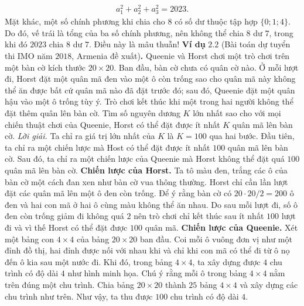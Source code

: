\begin{multicols}{2}
	\begin{align*}
		a_1^2 + a_2^2 + a_3^2 =2023.
	\end{align*}
	Mặt khác, một số chính phương khi chia cho $8$ có số dư thuộc tập hợp $\{0;1;4\}$. Do đó, vế trái là tổng của ba số chính phương, nên không thể chia $8$ dư $7$, trong khi đó $2023$ chia $8$ dư $7$. Điều này là mâu thuẫn!   
	\vskip 0.1cm
	\textbf{\color{hoccungpi}Ví dụ} $\pmb{2.2}$ (Bài toán dự tuyển thi IMO năm $2018$, Armenia đề xuất)\textbf{\color{hoccungpi}.}
	Queenie và Horst chơi một trò chơi trên một bàn cờ kích thước $20 \times 20$. Ban đầu, bàn cờ chưa có quân cờ nào. Ở mỗi lượt đi, Horst đặt một quân mã đen vào một ô còn trống sao cho quân mã này không thể ăn được bất cứ quân mã nào đã đặt trước đó; sau đó, Queenie đặt một quân hậu vào một ô trống tùy ý. Trò chơi kết thúc khi một trong hai người không thể đặt thêm quân lên bàn cờ. Tìm số nguyên dương $K$ lớn nhất sao cho với mọi chiến thuật chơi của Queenie, Horst có thể đặt được ít nhất $K$ quân mã lên bàn cờ.  
	\vskip 0.1cm
	\textit{Lời giải.}
	Ta chỉ ra giá trị lớn nhất của $K$ là $K=100$ qua hai bước. Đầu tiên, ta chỉ ra một chiến lược mà Host có thể đặt được ít nhất $100$ quân mã lên bàn cờ. Sau đó, ta chỉ ra một chiến lược của Queenie mà Horst không thể đặt quá $100$ quân mã lên bàn cờ.
	\vskip 0.1cm
	\textbf{\color{hoccungpi}Chiến lược của Horst.} Ta tô màu đen, trắng các ô của bàn cờ một cách đan xen như bàn cờ vua thông thường. Horst chỉ cần lần lượt đặt các quân mã lên một ô đen còn trống. Để ý rằng bàn cờ có $20\cdot 20/2 = 200$ ô đen và hai con mã ở hai ô cùng màu không thể ăn nhau. Do sau mỗi lượt đi, số ô đen còn trống giảm đi không quá $2$ nên trò chơi chỉ kết thúc sau ít nhất $100$ lượt đi và vì thế Horst có thể đặt được $100$ quân mã.
	\vskip 0.1cm
	\textbf{\color{hoccungpi}Chiến lược của Queenie.} Xét một bảng con $4 \times 4$ của bảng $20 \times 20$ ban đầu. Coi mỗi ô vuông đơn vị như một đỉnh đồ thị, hai đỉnh được nối với nhau khi và chỉ khi con mã có thể đi từ ô nọ đến ô kia sau một nước đi. Khi đó, trong bảng $4 \times 4$, ta xây dựng được $4$ chu trình có độ dài $4$ như hình minh họa. Chú ý rằng mỗi ô trong bảng $4\times 4$ nằm trên đúng một chu trình. Chia bảng $20 \times 20$ thành $25$ bảng $4 \times 4$ và xây dựng các chu trình như trên. Như vậy, ta thu được $100$ chu trình có độ dài $4$. 
	\begin{figure}[H]
		\vspace*{-5pt}
		\centering
		\begin{tikzpicture}[scale=0.9, hoccungpi]

\end{tikzpicture}
\end{figure}
\end{multicols}
